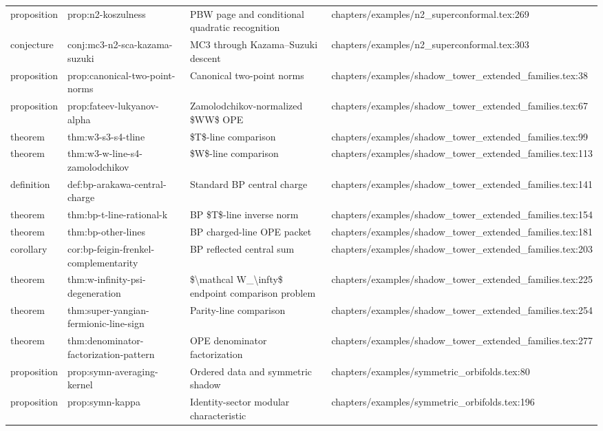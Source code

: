\documentclass[11pt]{article}
\begin{document}
\begin{longtable}{L{0.10\textwidth}L{0.26\textwidth}L{0.42\textwidth}L{0.22\textwidth}}
proposition & prop:n2-koszulness & PBW page and cond{}itional quadratic recognition & chapters/examples/n2\_superconformal.tex:269\\
conjecture & conj:mc3-n2-sca-kazama-suzuki & MC3 through Kazama--Suzuki descent & chapters/examples/n2\_superconformal.tex:303\\
proposition & prop:canonical-two-point-norms & Canonical two-point norms & chapters/examples/shadow\_tower\_extended\_families.tex:38\\
proposition & prop:fateev-lukyanov-alpha & Zamolodchikov-normalized \$WW\$ OPE & chapters/examples/shadow\_tower\_extended\_families.tex:67\\
theorem & thm:w3-s3-s4-tline & \$T\$-line comparison & chapters/examples/shadow\_tower\_extended\_families.tex:99\\
theorem & thm:w3-w-line-s4-zamolodchikov & \$W\$-line comparison & chapters/examples/shadow\_tower\_extended\_families.tex:113\\
definition & def:bp-arakawa-central-charge & Standard BP central charge & chapters/examples/shadow\_tower\_extended\_families.tex:141\\
theorem & thm:bp-t-line-rational-k & BP \$T\$-line inverse norm & chapters/examples/shadow\_tower\_extended\_families.tex:154\\
theorem & thm:bp-other-lines & BP charged-line OPE packet & chapters/examples/shadow\_tower\_extended\_families.tex:181\\
corollary & cor:bp-feigin-frenkel-complementarity & BP reflected central sum & chapters/examples/shadow\_tower\_extended\_families.tex:203\\
theorem & thm:w-infinity-psi-degeneration & \$\textbackslash{}mathcal W\_\textbackslash{}infty\$ endpoint comparison problem & chapters/examples/shadow\_tower\_extended\_families.tex:225\\
theorem & thm:super-yangian-fermionic-line-sign & Parity-line comparison & chapters/examples/shadow\_tower\_extended\_families.tex:254\\
theorem & thm:denominator-factorization-pattern & OPE denominator factorization & chapters/examples/shadow\_tower\_extended\_families.tex:277\\
proposition & prop:symn-averaging-kernel & Ordered data and symmetric shadow & chapters/examples/symmetric\_orbifolds.tex:80\\
proposition & prop:symn-kappa & Identity-sector modular characteristic & chapters/examples/symmetric\_orbifolds.tex:196\\

\end{longtable}
\end{document}
